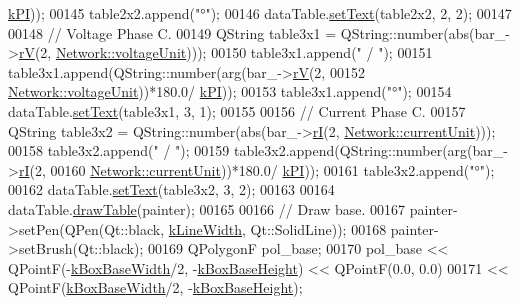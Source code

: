 \begin{DoxyCode}
      \hyperlink{math__constants_8h_a368d99984512d9a6c6f18b37b4446431}{kPI}));
00145   table2x2.append(\textcolor{stringliteral}{"°"});
00146   dataTable.\hyperlink{class_data_table_aee0d28c77116b51360f0124a529cb3ff}{setText}(table2x2, 2, 2);
00147 
00148   \textcolor{comment}{// Voltage Phase C.}
00149   QString table3x1 = QString::number(abs(bar\_->\hyperlink{group___models_ga2d1f6bfbd8abaf168bb75bd8e5cd9b5e}{rV}(2, \hyperlink{group___graphics_gacde031ef95f5c05565ee35769f2ed89e}{Network::voltageUnit})));
00150   table3x1.append(\textcolor{stringliteral}{" / "});
00151   table3x1.append(QString::number(arg(bar\_->\hyperlink{group___models_ga2d1f6bfbd8abaf168bb75bd8e5cd9b5e}{rV}(2,
00152                                       \hyperlink{group___graphics_gacde031ef95f5c05565ee35769f2ed89e}{Network::voltageUnit}))*180.0/
      \hyperlink{math__constants_8h_a368d99984512d9a6c6f18b37b4446431}{kPI}));
00153   table3x1.append(\textcolor{stringliteral}{"°"});
00154   dataTable.\hyperlink{class_data_table_aee0d28c77116b51360f0124a529cb3ff}{setText}(table3x1, 3, 1);
00155 
00156   \textcolor{comment}{// Current Phase C.}
00157   QString table3x2 = QString::number(abs(bar\_->\hyperlink{group___models_ga8a009531f01430aa68eba739bb0dc2ea}{rI}(2, \hyperlink{group___graphics_gac6a26db5fef2b1dd2a00faf6340d1702}{Network::currentUnit})));
00158   table3x2.append(\textcolor{stringliteral}{" / "});
00159   table3x2.append(QString::number(arg(bar\_->\hyperlink{group___models_ga8a009531f01430aa68eba739bb0dc2ea}{rI}(2,
00160                                       \hyperlink{group___graphics_gac6a26db5fef2b1dd2a00faf6340d1702}{Network::currentUnit}))*180.0/
      \hyperlink{math__constants_8h_a368d99984512d9a6c6f18b37b4446431}{kPI}));
00161   table3x2.append(\textcolor{stringliteral}{"°"});
00162   dataTable.\hyperlink{class_data_table_aee0d28c77116b51360f0124a529cb3ff}{setText}(table3x2, 3, 2);
00163 
00164   dataTable.\hyperlink{class_data_table_a3a3695e88dcd4d4aad5cc941ec7e6e55}{drawTable}(painter);
00165 
00166   \textcolor{comment}{// Draw base.}
00167   painter->setPen(QPen(Qt::black, \hyperlink{class_info_bar_a9592abdb63cc3cfffc6e5826f998a353}{kLineWidth}, Qt::SolidLine));
00168   painter->setBrush(Qt::black);
00169   QPolygonF pol\_base;
00170   pol\_base << QPointF(-\hyperlink{class_info_bar_a3eb5cc879199e1a927ed76eb989c4c0e}{kBoxBaseWidth}/2, -\hyperlink{class_info_bar_a0f2f7b614000ae1d317ec3819acabbf2}{kBoxBaseHeight}) << QPointF(0.0, 0.0)
00171            << QPointF(\hyperlink{class_info_bar_a3eb5cc879199e1a927ed76eb989c4c0e}{kBoxBaseWidth}/2, -\hyperlink{class_info_bar_a0f2f7b614000ae1d317ec3819acabbf2}{kBoxBaseHeight});

\end{DoxyCode}
